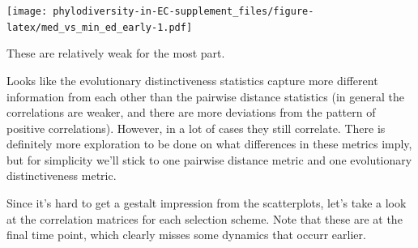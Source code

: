 \documentclass[]{book}
\newenvironment{Shaded}{\begin{snugshade}}{\end{snugshade}}
\newcommand{\DataTypeTok}[1]{\textcolor[rgb]{0.13,0.29,0.53}{#1}}
\newcommand{\DecValTok}[1]{\textcolor[rgb]{0.00,0.00,0.81}{#1}}
\newcommand{\KeywordTok}[1]{\textcolor[rgb]{0.13,0.29,0.53}{\textbf{#1}}}
\newcommand{\NormalTok}[1]{#1}
\newcommand{\OperatorTok}[1]{\textcolor[rgb]{0.81,0.36,0.00}{\textbf{#1}}}
\newcommand{\StringTok}[1]{\textcolor[rgb]{0.31,0.60,0.02}{#1}}
\begin{document}
\begin{Shaded}
\end{Shaded}

\texttt{[image: phylodiversity-in-EC-supplement\_files/figure-latex/med\_vs\_min\_ed\_early-1.pdf]}

These are relatively weak for the most part.

Looks like the evolutionary distinctiveness statistics capture more different information from each other than the pairwise distance statistics (in general the correlations are weaker, and there are more deviations from the pattern of positive correlations). However, in a lot of cases they still correlate. There is definitely more exploration to be done on what differences in these metrics imply, but for simplicity we'll stick to one pairwise distance metric and one evolutionary distinctiveness metric.

Since it's hard to get a gestalt impression from the scatterplots, let's take a look at the correlation matrices for each selection scheme. Note that these are at the final time point, which clearly misses some dynamics that occurr earlier.
\end{document}
